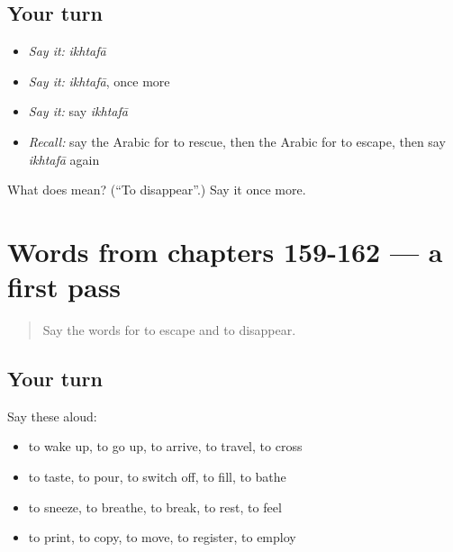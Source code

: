 \subsection*{Your turn}
\begin{itemize}
\raggedright
  \item \emph{Say it:} \emph{ikhtafā}
  \item \emph{Say it:} \emph{ikhtafā}, once more
  \item \emph{Say it:} say \emph{ikhtafā}
  \item \emph{Recall:} say the Arabic for to rescue, then the Arabic for to escape, then say \emph{ikhtafā} again
\end{itemize}

\begin{tcolorbox}[breakable,colback=teal!4,colframe=teal!35!black,title={Before you move on}]
What does  mean? (\textquotedblleft{}To disappear\textquotedblright{}.) Say it once more.
\end{tcolorbox}
\section[(dialogue)]{Words from chapters 159-162 — a first pass}

\label{lesson:AR-R167-first-pass-words-from-chapters-159-162}



\begin{quote}
Say the words for to escape and to disappear.
\end{quote}

\subsection*{Your turn}
Say these aloud:

\begin{itemize}
\raggedright
  \item to wake up, to go up, to arrive, to travel, to cross
  \item to taste, to pour, to switch off, to fill, to bathe
  \item to sneeze, to breathe, to break, to rest, to feel
  \item to print, to copy, to move, to register, to employ
\end{itemize}

